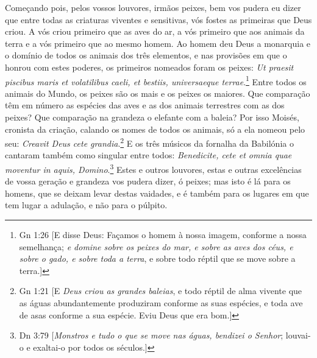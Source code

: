 Começando pois, pelos vossos louvores, irmãos peixes, bem vos pudera eu
dizer que entre todas as criaturas viventes e sensitivas, vós fostes as
primeiras que Deus criou. A vós criou primeiro que as aves do ar, a vós
primeiro que aos animais da terra e a vós primeiro que ao mesmo homem.
Ao homem deu Deus a monarquia e o domínio de todos os animais dos três
elementos, e nas provisões em que o honrou com estes poderes, os
primeiros nomeados foram os peixes: \emph{Ut praesit piscibus maris et
volatilibus caeli, et bestiis, universaeque terrae}.\footnote{Gn 1:26 [E disse Deus: Façamos o homem à nossa imagem, conforme a nossa semelhança; \emph{e domine sobre os peixes do mar, e sobre as aves dos céus, e sobre o gado, e sobre toda a terra}, e
sobre todo réptil que se move sobre a terra.]} Entre todos os
animais do Mundo, os peixes são os mais e os peixes os maiores. Que
comparação têm em número as espécies das aves e as dos animais
terrestres com as dos peixes? Que comparação na grandeza o elefante com
a baleia? Por isso Moisés, cronista da criação, calando os nomes de
todos os animais, só a ela nomeou pelo seu: \emph{Creavit Deus cete
grandia}.\footnote{Gn 1:21 [E \emph{Deus criou as grandes baleias}, e todo réptil de alma vivente que as águas abundantemente produziram conforme as suas espécies, e toda ave de asas conforme a sua espécie. Eviu Deus que era bom.]} E os três músicos da fornalha da Babilónia o cantaram também
como singular entre todos: \emph{Benedicite, cete et omnia quae moventur
in aquis, Domino}.\footnote{Dn 3:79 [\emph{Monstros e tudo o que se move nas águas, bendizei o Senhor}; louvai-o e exaltai-o por todos os séculos.]} Estes e outros louvores, estas e outras excelências
de vossa geração e grandeza vos pudera dizer, ó peixes; mas isto é lá
para os homens, que se deixam levar destas vaidades, e é também para os
lugares em que tem lugar a adulação, e não para o púlpito.

